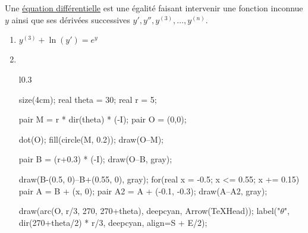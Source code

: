 \part{}

\begin{defn}
	Une \underline{équation différentielle} est une égalité faisant intervenir une fonction inconnue $y$ ainsi que ses dérivées successives $y', y'', y^{(3)}, \ldots, y^{(n)}$.
\end{defn}

\begin{exm}
	\begin{enumerate}
		\item $y^{(3)} + \ln\left( y' \right) = e^{y}$ 
		\item ~\\
			\begin{minipage}
				{\linewidth}
				\begin{wrapfigure}
					{l}{0.3\linewidth}
					\vspace{-1.5cm}
					\centering
					\begin{asy}
						size(4cm);
						real theta = 30;
						real r = 5;

						pair M = r * dir(theta) * (-I);
						pair O = (0,0);

						dot(O);
						fill(circle(M, 0.2));
						draw(O--M);

						pair B = (r+0.3) * (-I);
						draw(O--B, gray);

						draw(B-(0.5, 0)--B+(0.55, 0), gray);
						for(real x = -0.5; x <= 0.55; x += 0.15) {
							pair A = B + (x, 0);
							pair A2 = A + (-0.1, -0.3);
							draw(A--A2, gray);
						}

						draw(arc(O, r/3, 270, 270+theta), deepcyan, Arrow(TeXHead));
						label("$\theta$", dir(270+theta/2) * r/3, deepcyan, align=S + E/2);
					\end{asy}
				\end{wrapfigure}


\end{minipage}
\end{enumerate}
\end{exm}
